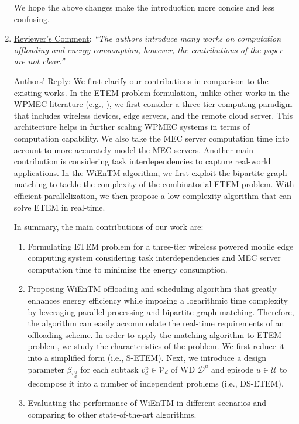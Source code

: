 \documentclass[12pt,draftclsnofoot,onecolumn]{IEEEtran}
\begin{document}
\begin{enumerate}
We hope the above changes make the introduction more concise and less confusing.\\

\item \underline{Reviewer's Comment}: \textit {``The authors introduce many works on computation offloading and energy consumption, however, the contributions of the paper are not clear.''} \newline

\underline{Authors' Reply}: We first clarify our contributions in comparison to the existing works. In the ETEM problem formulation, unlike other works in the WPMEC literature (e.g., \cite{b11,b13,b28}), we first consider a three-tier computing paradigm that includes wireless devices, edge servers, and the remote cloud server. This architecture helps in further scaling WPMEC systems in terms of computation capability. We also take the MEC server computation time into account to more accurately model the MEC servers. Another main contribution is considering task interdependencies to capture real-world applications. In the WiEnTM algorithm, we first exploit the bipartite graph matching to tackle the complexity of the combinatorial ETEM problem. With efficient parallelization, we then propose a low complexity algorithm that can solve ETEM in real-time.

In summary, the main contributions of our work are:

\begin{enumerate}
	\item Formulating ETEM problem for a three-tier wireless powered mobile edge computing system considering task interdependencies and MEC server computation time to minimize the energy consumption.
	\item Proposing WiEnTM offloading and scheduling algorithm that greatly enhances energy efficiency while imposing a logarithmic time complexity by leveraging parallel processing and bipartite graph matching. Therefore, the algorithm can easily accommodate the real-time requirements of an offloading scheme. In order to apply the matching algorithm to ETEM problem, we study the characteristics of the problem. We first reduce it into a simplified form (i.e., S-ETEM). Next, we introduce a design parameter $\beta_{v_d^u}$ for each subtask $v_d^u\in\mathcal{V}_d$ of WD $\mathcal{D}^u$ and episode $u\in\mathcal{U}$ to decompose it into a number of independent problems (i.e., DS-ETEM).
	\item Evaluating the performance of WiEnTM in different scenarios and comparing to other state-of-the-art algorithms.
\end{enumerate}


\end{enumerate}
\end{document}
